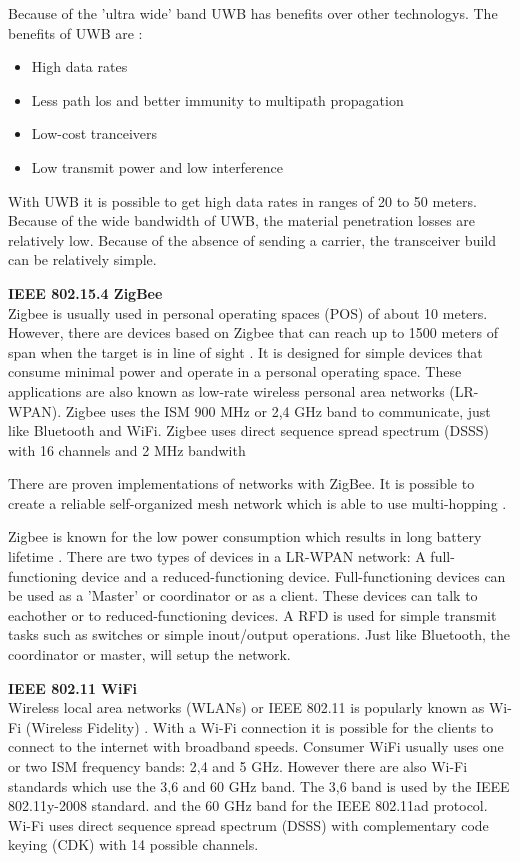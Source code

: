 \documentclass[10pt,a4paper]{article}
\begin{document}
Because of the 'ultra wide' band UWB has benefits over other technologys. The benefits of UWB are \cite{ultrawidebandwirelesscommunications}: 
\begin{itemize}
\setlength\itemsep{0em}
    \item High data rates
    \item Less path los and better immunity to multipath propagation
    \item Low-cost tranceivers
    \item Low transmit power and low interference
\end{itemize}
 With UWB it is possible to get high data rates in ranges of 20 to 50 meters. Because of the wide bandwidth of UWB, the material penetration losses are relatively low. Because of the absence of sending a carrier, the transceiver build can be relatively simple. \cite{ultrawidebandwirelesscommunications}

\textbf{IEEE 802.15.4 ZigBee}\\
Zigbee is usually used in personal operating spaces (POS) of about 10 meters. However, there are devices based on Zigbee that can reach up to 1500 meters of span when the target is in line of sight \cite{zigbeewiki}. It is designed for simple devices that consume minimal power and operate in a personal operating space. These applications are also known as low-rate wireless personal area networks (LR-WPAN). \cite{comparitivestudywirelessprotocols} Zigbee uses the ISM 900 MHz or 2,4 GHz band to communicate, just like Bluetooth and WiFi. Zigbee uses direct sequence spread spectrum (DSSS) with 16 channels and 2 MHz bandwith

There are proven implementations of networks with ZigBee. It is possible to create a reliable self-organized mesh network which is able to use multi-hopping \cite{comparitivestudywirelessprotocols}.

Zigbee is known for the low power consumption which results in long battery lifetime \cite{performanceevaluationlowratewirelesspan}. There are two types of devices in a LR-WPAN network: A full-functioning device and a reduced-functioning device. Full-functioning devices can be used as a 'Master' or coordinator or as a client. These devices can talk to eachother or to reduced-functioning devices. A RFD is used for simple transmit tasks such as switches or simple inout/output operations. Just like Bluetooth, the coordinator or master, will setup the network.

\textbf{IEEE 802.11 WiFi}\\
Wireless local area networks (WLANs) or IEEE 802.11 is popularly known as Wi-Fi (Wireless Fidelity) \cite{wirelessmeshnetworksopportunitiesandchallenges}. With a Wi-Fi connection it is possible for the clients to connect to the internet with broadband speeds. Consumer WiFi usually uses one or two ISM frequency bands: 2,4 and 5 GHz. However there are also Wi-Fi standards which use the 3,6 and 60 GHz band. The 3,6 band is used by the IEEE 802.11y-2008 standard. and the 60 GHz band for the IEEE 802.11ad protocol. Wi-Fi uses direct sequence spread spectrum (DSSS) with complementary code keying (CDK) with 14 possible channels.
\end{document}

